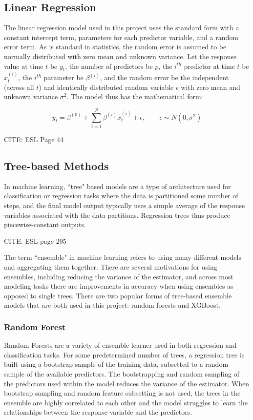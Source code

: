 
\subsection*{Linear Regression}

The linear regression model used in this project uses the standard form with a constant intercept term, parameters for each predictor variable, and a random error term. As is standard in statistics, the random error is assumed to be normally distributed with zero mean and unknown variance. Let the response value at time $t$ be $y_t$, the number of predictors be $p$, the $i^{th}$ predictor at time $t$ be $x^{(i)}_t$, the $i^{th}$ parameter be $\beta^{(i)}$, and the random error be the  independent (across all $t$) and identically distributed random variable $\epsilon$ with zero mean and unknown variance $\sigma^2$. The model thus has the mathematical form:

\[
y_t = \beta^{(0)} + \sum_{i=1}^p \beta^{(i)} x^{(i)}_t + \epsilon, \qquad \epsilon\sim N(0, \sigma^2)
\]

CITE: ESL Page 44

\subsection*{Tree-based Methods}

In machine learning, ``tree" based models are a type of architecture used for classification or regression tasks where the data is partitioned some number of steps, and the final model output typically uses a simple average of the response variables associated with the data partitions. Regression trees thus produce piecewise-constant outputs.

CITE: ESL page 295

The term ``ensemble" in machine learning refers to using many different models and aggregating them together. There are several motivations for using ensembles, including reducing the variance of the estimator, and across most modeling tasks there are improvements in accuracy when using ensembles as opposed to single trees. There are two popular forms of tree-based ensemble models that are both used in this project: random forests and XGBoost.

\subsubsection*{Random Forest}

Random Forests are a variety of ensemble learner used in both regression and classification tasks. For some predetermined number of trees, a regression tree is built using a bootstrap sample of the training data, subsetted to a random sample of the available predictors. The bootstrapping and random sampling of the predictors used within the model reduces the variance of the estimator. When bootstrap sampling and random feature subsetting is not used, the trees in the ensemble are highly correlated to each other and the model struggles to learn the relationships between the response variable and the predictors. 

